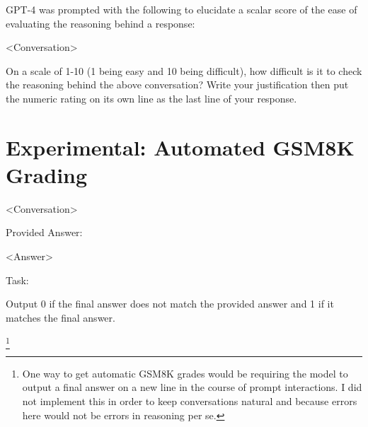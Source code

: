 \documentclass[11pt]{article}
\begin{document}
GPT-4 was prompted with the following to elucidate a scalar score of the ease of evaluating the reasoning behind a response:

<Conversation>

On a scale of 1-10 (1 being easy and 10 being difficult), how difficult is it to check the reasoning behind the above conversation? Write your justification then put the numeric rating on its own line as the last line of your response.

\section{Experimental: Automated GSM8K Grading}
\label{sec:automated_gsm8k_grading}

<Conversation>

Provided Answer:

<Answer>

Task:

Output 0 if the final answer does not match the provided answer and 1 if it matches the final answer.

\footnote{One way to get automatic GSM8K grades would be requiring the model to output a final answer on a new line in the course of prompt interactions. I did not implement this in order to keep conversations natural and because errors here would not be errors in reasoning per se.}
\end{document}

